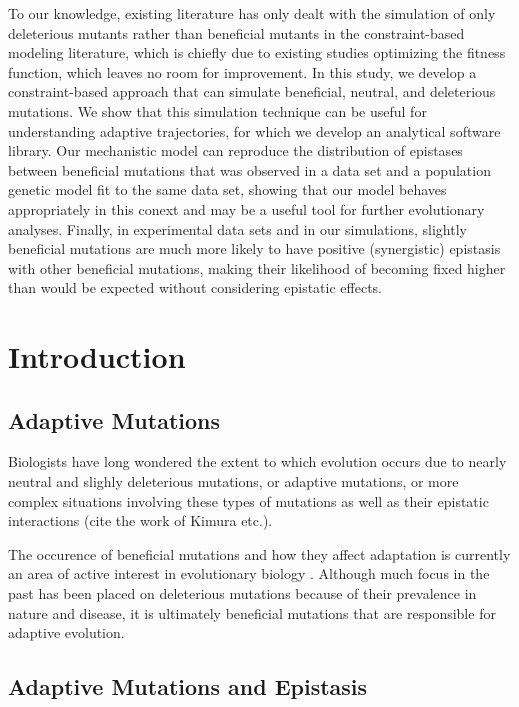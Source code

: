 
To our knowledge, existing literature has only dealt with the
simulation of only deleterious mutants rather than beneficial mutants
in the constraint-based modeling literature, which is chiefly due to
existing studies optimizing the fitness function, which leaves no room
for improvement. In this study, we develop a constraint-based
approach that can simulate beneficial, neutral, and deleterious
mutations.  We show that this simulation technique can be useful for
understanding adaptive trajectories, for which we develop an
analytical software library.  Our mechanistic model can reproduce the
distribution of epistases between beneficial mutations that was
observed in a data set and a population genetic model fit to the same
data set, showing that our model behaves appropriately in this conext
and may be a useful tool for further evolutionary analyses. Finally,
in experimental data sets and in our simulations, slightly beneficial
mutations are much more likely to have positive (synergistic)
epistasis with other beneficial mutations, making their likelihood of
becoming fixed higher than would be expected without considering
epistatic effects.


\section{Introduction}

\subsection{Adaptive Mutations}

Biologists have long wondered the extent to which evolution occurs due
to nearly neutral and slighly deleterious mutations, or adaptive
mutations, or more complex situations involving these types of
mutations as well as their epistatic interactions (cite the work of
Kimura etc.).

The occurence of beneficial mutations and how they affect adaptation
is currently an area of active interest in evolutionary biology
\cite{Chou2011} \cite{Weinreich2006}. Although much focus in the past
has been placed on deleterious mutations because of their prevalence
in nature and disease, it is ultimately beneficial mutations that
are responsible for adaptive evolution.
 
\subsection{Adaptive Mutations and Epistasis}



